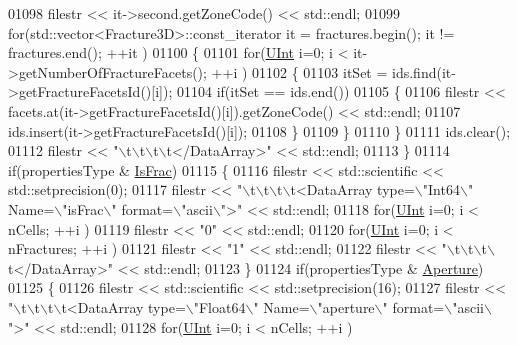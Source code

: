 \begin{DoxyCode}
01098             filestr << it->second.getZoneCode() << std::endl;
01099         \textcolor{keywordflow}{for}(std::vector<Fracture3D>::const\_iterator it = fractures.begin(); it != fractures.end(); ++it )
01100         \{
01101             \textcolor{keywordflow}{for}(\hyperlink{namespaceFVCode3D_a4bf7e328c75d0fd504050d040ebe9eda}{UInt} i=0; i < it->getNumberOfFractureFacets(); ++i )
01102             \{
01103                 itSet = ids.find(it->getFractureFacetsId()[i]);
01104                 \textcolor{keywordflow}{if}(itSet == ids.end())
01105                 \{
01106                     filestr << facets.at(it->getFractureFacetsId()[i]).getZoneCode() << std::endl;
01107                     ids.insert(it->getFractureFacetsId()[i]);
01108                 \}
01109             \}
01110         \}
01111         ids.clear();
01112         filestr << \textcolor{stringliteral}{"\(\backslash\)t\(\backslash\)t\(\backslash\)t\(\backslash\)t</DataArray>"} << std::endl;
01113     \}
01114     \textcolor{keywordflow}{if}(propertiesType & \hyperlink{namespaceFVCode3D_ab3abc77722284ce4344be90bb61c1a41ad2b21a53311e3478541b39809a3877b9}{IsFrac})
01115     \{
01116         filestr << std::scientific << std::setprecision(0);
01117         filestr << \textcolor{stringliteral}{"\(\backslash\)t\(\backslash\)t\(\backslash\)t\(\backslash\)t<DataArray type=\(\backslash\)"Int64\(\backslash\)" Name=\(\backslash\)"isFrac\(\backslash\)" format=\(\backslash\)"ascii\(\backslash\)">"} << std::endl;
01118         \textcolor{keywordflow}{for}(\hyperlink{namespaceFVCode3D_a4bf7e328c75d0fd504050d040ebe9eda}{UInt} i=0; i < nCells; ++i )
01119             filestr << \textcolor{stringliteral}{"0"} << std::endl;
01120         \textcolor{keywordflow}{for}(\hyperlink{namespaceFVCode3D_a4bf7e328c75d0fd504050d040ebe9eda}{UInt} i=0; i < nFractures; ++i )
01121             filestr << \textcolor{stringliteral}{"1"} << std::endl;
01122         filestr << \textcolor{stringliteral}{"\(\backslash\)t\(\backslash\)t\(\backslash\)t\(\backslash\)t</DataArray>"} << std::endl;
01123     \}
01124     \textcolor{keywordflow}{if}(propertiesType & \hyperlink{namespaceFVCode3D_ab3abc77722284ce4344be90bb61c1a41a7bea6d441c4661b396fc86912312c47e}{Aperture})
01125     \{
01126         filestr << std::scientific << std::setprecision(16);
01127         filestr << \textcolor{stringliteral}{"\(\backslash\)t\(\backslash\)t\(\backslash\)t\(\backslash\)t<DataArray type=\(\backslash\)"Float64\(\backslash\)" Name=\(\backslash\)"aperture\(\backslash\)" format=\(\backslash\)"ascii\(\backslash\)">"} << std::endl;
01128         \textcolor{keywordflow}{for}(\hyperlink{namespaceFVCode3D_a4bf7e328c75d0fd504050d040ebe9eda}{UInt} i=0; i < nCells; ++i )

\end{DoxyCode}
